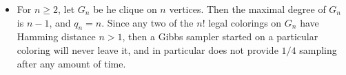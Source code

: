 \documentclass[11pt]{article} \usepackage{amssymb}
\begin{document}
\begin{itemize}
\item
For $n \geq 2$, let $G_n$ be he clique on $n$ vertices. Then the maximal degree
of $G_n$ is $n-1$, and $q_n=n$. Since any two of the $n!$ legal colorings on 
$G_n$ have
Hamming distance $n>1$, then a Gibbs sampler started on a particular coloring
will never leave it, and in particular does not provide $1/4$ sampling after
any amount of time.


\end{itemize}
\end{document}
